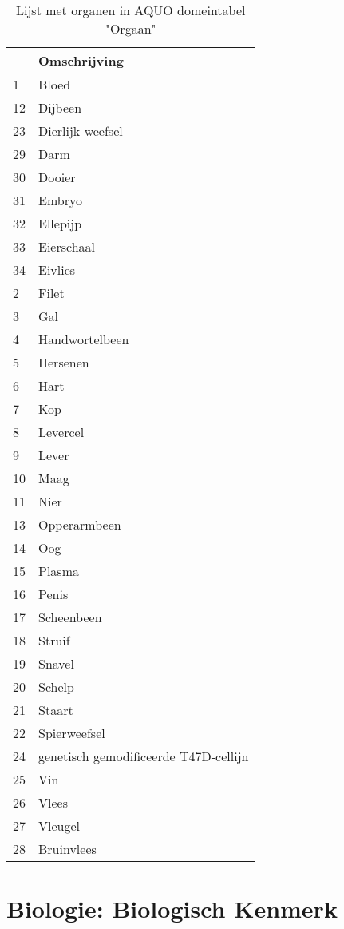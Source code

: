 \documentclass[
]{book}
\begin{document}
\begin{table}

\caption{\label{tab:unnamed-chunk-2}Lijst met organen in AQUO domeintabel "Orgaan"}
\centering
\begin{tabular}[t]{l|l}
\hline
  & Omschrijving\\
\hline
1 & Bloed\\
\hline
12 & Dijbeen\\
\hline
23 & Dierlijk weefsel\\
\hline
29 & Darm\\
\hline
30 & Dooier\\
\hline
31 & Embryo\\
\hline
32 & Ellepijp\\
\hline
33 & Eierschaal\\
\hline
34 & Eivlies\\
\hline
2 & Filet\\
\hline
3 & Gal\\
\hline
4 & Handwortelbeen\\
\hline
5 & Hersenen\\
\hline
6 & Hart\\
\hline
7 & Kop\\
\hline
8 & Levercel\\
\hline
9 & Lever\\
\hline
10 & Maag\\
\hline
11 & Nier\\
\hline
13 & Opperarmbeen\\
\hline
14 & Oog\\
\hline
15 & Plasma\\
\hline
16 & Penis\\
\hline
17 & Scheenbeen\\
\hline
18 & Struif\\
\hline
19 & Snavel\\
\hline
20 & Schelp\\
\hline
21 & Staart\\
\hline
22 & Spierweefsel\\
\hline
24 & genetisch gemodificeerde T47D-cellijn\\
\hline
25 & Vin\\
\hline
26 & Vlees\\
\hline
27 & Vleugel\\
\hline
28 & Bruinvlees\\
\hline
\end{tabular}
\end{table}

\hypertarget{biologie-biologisch-kenmerk-1}{%
\section{Biologie: Biologisch Kenmerk}\label{biologie-biologisch-kenmerk-1}}
\end{document}
